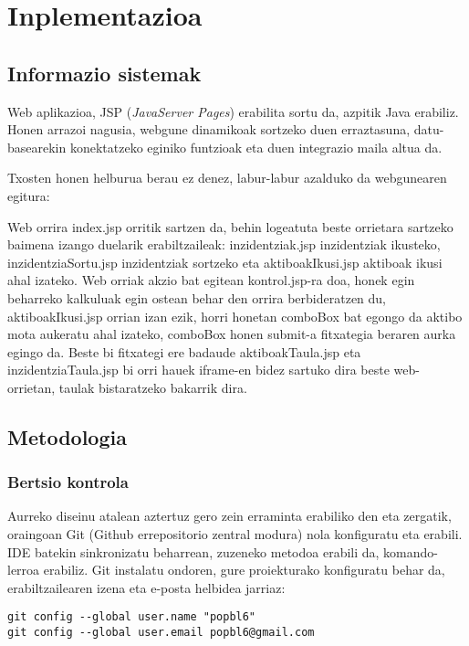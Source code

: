
\section{Inplementazioa}
\subsection{Informazio sistemak}
Web aplikazioa, JSP (\textit{JavaServer Pages}) erabilita sortu da, azpitik Java erabiliz. Honen arrazoi nagusia, webgune dinamikoak sortzeko duen erraztasuna, datu-basearekin konektatzeko eginiko funtzioak eta duen integrazio maila altua da.

Txosten honen helburua berau ez denez, labur-labur azalduko da webgunearen egitura: 

Web orrira index.jsp orritik sartzen da, behin logeatuta beste orrietara sartzeko baimena izango duelarik erabiltzaileak: inzidentziak.jsp inzidentziak ikusteko, inzidentziaSortu.jsp inzidentziak sortzeko eta aktiboakIkusi.jsp aktiboak ikusi ahal izateko. Web orriak akzio bat egitean kontrol.jsp-ra doa, honek egin beharreko kalkuluak egin ostean behar den orrira berbideratzen du, aktiboakIkusi.jsp orrian izan ezik, horri honetan comboBox bat egongo da aktibo mota aukeratu ahal izateko, comboBox honen submit-a fitxategia beraren aurka egingo da. Beste bi fitxategi ere badaude  aktiboakTaula.jsp eta inzidentziaTaula.jsp bi orri hauek iframe-en bidez sartuko dira beste web-orrietan, taulak bistaratzeko bakarrik dira.

\subsection{Metodologia}
\subsubsection{Bertsio kontrola}
\label{sec:gitinp}
Aurreko diseinu atalean aztertuz gero zein erraminta erabiliko den eta zergatik, oraingoan Git (Github errepositorio zentral modura) nola konfiguratu eta erabili. IDE batekin sinkronizatu beharrean, zuzeneko metodoa erabili da, komando-lerroa erabiliz. Git instalatu ondoren, gure proiekturako konfiguratu behar da, erabiltzailearen izena eta e-posta helbidea jarriaz:

\begin{verbatim}
git config --global user.name "popbl6"
git config --global user.email popbl6@gmail.com
\end{verbatim}   

